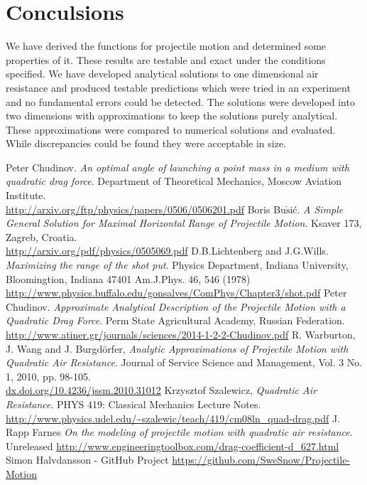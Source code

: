 \documentclass[%
aip,
jmp,
amsmath,amssymb,
reprint,%
]{revtex4-1}
\begin{document}
	\section{Conculsions}
	We have derived the functions for projectile motion and determined some properties of it. These results are testable and exact under the conditions specified. We have developed analytical solutions to one dimensional air resistance and produced testable predictions which were tried in an experiment and no fundamental errors could be detected. The solutions were developed into two dimensions with approximations to keep the solutions purely analytical. These approximations were compared to numerical solutions and evaluated. While discrepancies could be found they were acceptable in size.
	\begin{thebibliography}{7}
		Peter Chudinov. \textit{An optimal angle of launching a point mass in a medium with quadratic drag force}.
		Department of Theoretical Mechanics, Moscow Aviation Institute.
		\\\url{http://arxiv.org/ftp/physics/papers/0506/0506201.pdf}
		Boris Bu$\check{\mathrm{s}}$i\'{c}. \textit{A Simple General Solution for Maximal Horizontal Range of Projectile Motion}.
		Ksaver 173, Zagreb, Croatia.
		\\\url{http://arxiv.org/pdf/physics/0505069.pdf}
		D.B.Lichtenberg and J.G.Wills. \textit{Maximizing the range of the shot put}.
		Physics Department, Indiana University, Bloomingtion, Indiana 47401
		Am.J.Phys. 46, 546 (1978)
		\\\url{http://www.physics.buffalo.edu/gonsalves/ComPhys/Chapter3/shot.pdf}
		Peter Chudinov. \textit{Approximate Analytical Description of the Projectile Motion with a Quadratic Drag Force}.
		Perm State Agricultural Academy, Russian Federation.
		\\\url{http://www.atiner.gr/journals/sciences/2014-1-2-2-Chudinov.pdf}
		R. Warburton, J. Wang and J. Burgdörfer, \textit{Analytic Approximations of Projectile Motion with Quadratic Air Resistance}.
		Journal of Service Science and Management, Vol. 3 No. 1, 2010, pp. 98-105. \\\url{dx.doi.org/10.4236/jssm.2010.31012}
		Krzysztof Szalewicz, \textit{Quadratic Air Resistance}.
		PHYS 419: Classical Mechanics Lecture Notes.
		\\\url{http://www.physics.udel.edu/~szalewic/teach/419/cm08ln_quad-drag.pdf}
		J. Rapp Farnes \textit{On the modeling of projectile motion with quadratic air resistance}.
		Unreleased
		\url{http://www.engineeringtoolbox.com/drag-coefficient-d_627.html}
		Simon Halvdansson - GitHub Project
		\url{https://github.com/SweSnow/Projectile-Motion}	
	\end{thebibliography}
\end{document}
